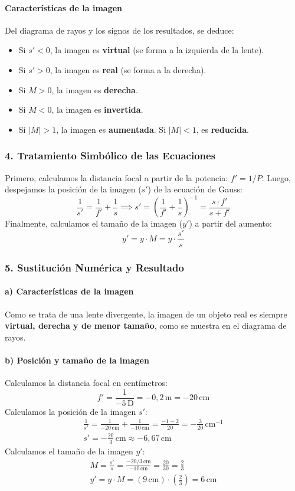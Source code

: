 \paragraph*{Características de la imagen}
Del diagrama de rayos y los signos de los resultados, se deduce:
\begin{itemize}
    \item Si $s' < 0$, la imagen es \textbf{virtual} (se forma a la izquierda de la lente).
    \item Si $s' > 0$, la imagen es \textbf{real} (se forma a la derecha).
    \item Si $M > 0$, la imagen es \textbf{derecha}.
    \item Si $M < 0$, la imagen es \textbf{invertida}.
    \item Si $|M| > 1$, la imagen es \textbf{aumentada}. Si $|M| < 1$, es \textbf{reducida}.
\end{itemize}

\subsubsection*{4. Tratamiento Simbólico de las Ecuaciones}
Primero, calculamos la distancia focal a partir de la potencia: $f' = 1/P$.
Luego, despejamos la posición de la imagen ($s'$) de la ecuación de Gauss:
$$\frac{1}{s'} = \frac{1}{f'} + \frac{1}{s} \implies s' = \left(\frac{1}{f'} + \frac{1}{s}\right)^{-1} = \frac{s \cdot f'}{s + f'}$$
Finalmente, calculamos el tamaño de la imagen ($y'$) a partir del aumento:
$$y' = y \cdot M = y \cdot \frac{s'}{s}$$

\subsubsection*{5. Sustitución Numérica y Resultado}
\paragraph{a) Características de la imagen}
Como se trata de una lente divergente, la imagen de un objeto real es siempre \textbf{virtual, derecha y de menor tamaño}, como se muestra en el diagrama de rayos.

\paragraph{b) Posición y tamaño de la imagen}
Calculamos la distancia focal en centímetros:
$$f' = \frac{1}{-5\,\text{D}} = -0,2\,\text{m} = -20\,\text{cm}$$
Calculamos la posición de la imagen $s'$:
\begin{gather}
    \frac{1}{s'} = \frac{1}{-20\,\text{cm}} + \frac{1}{-10\,\text{cm}} = \frac{-1 - 2}{20} = -\frac{3}{20}\,\text{cm}^{-1} \\
    s' = -\frac{20}{3}\,\text{cm} \approx -6,67\,\text{cm}
\end{gather}
Calculamos el tamaño de la imagen $y'$:
\begin{gather}
    M = \frac{s'}{s} = \frac{-20/3\,\text{cm}}{-10\,\text{cm}} = \frac{20}{30} = \frac{2}{3} \\
    y' = y \cdot M = (9\,\text{cm}) \cdot \left(\frac{2}{3}\right) = 6\,\text{cm}
\end{gather}

